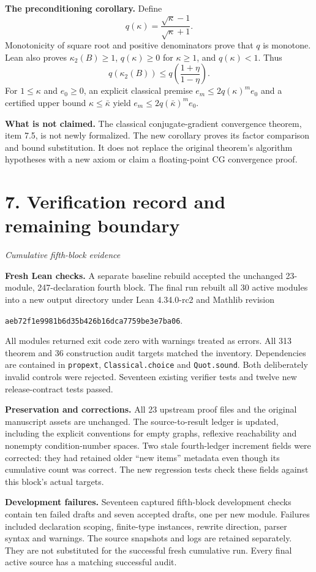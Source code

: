 \documentclass[11pt]{article}
\newcommand{\code}[1]{\texttt{\small #1}}
\newcommand{\pageheading}[2]{\section*{\color{ink}#1}\textit{#2}\par}
\begin{document}
\textbf{The preconditioning corollary.} Define
\[
q(\kappa)=\frac{\sqrt\kappa-1}{\sqrt\kappa+1}.
\]
Monotonicity of square root and positive denominators prove that $q$ is monotone. Lean also proves $\kappa_2(B)\geq1$, $q(\kappa)\geq0$ for $\kappa\geq1$, and $q(\kappa)<1$. Thus
\[
\boxed{q(\kappa_2(B))\leq q\!\left(\frac{1+\eta}{1-\eta}\right).}
\]
For $1\leq\kappa$ and $e_0\geq0$, an explicit classical premise $e_m\leq2q(\kappa)^m e_0$ and a certified upper bound $\kappa\leq\bar\kappa$ yield $e_m\leq2q(\bar\kappa)^m e_0$.

\textbf{What is not claimed.} The classical conjugate-gradient convergence theorem, item 7.5, is not newly formalized. The new corollary proves its factor comparison and bound substitution. It does not replace the original theorem's algorithm hypotheses with a new axiom or claim a floating-point CG convergence proof.

\newpage
\pageheading{7. Verification record and remaining boundary}{Cumulative fifth-block evidence}
\textbf{Fresh Lean checks.} A separate baseline rebuild accepted the unchanged 23-module, 247-declaration fourth block. The final run rebuilt all 30 active modules into a new output directory under Lean 4.34.0-rc2 and Mathlib revision
\begin{center}\code{aeb72f1e9981b6d35b426b16dca7759be3e7ba06}.\end{center}
All modules returned exit code zero with warnings treated as errors. All 313 theorem and 36 construction audit targets matched the inventory. Dependencies are contained in \code{propext}, \code{Classical.choice} and \code{Quot.sound}. Both deliberately invalid controls were rejected. Seventeen existing verifier tests and twelve new release-contract tests passed.

\textbf{Preservation and corrections.} All 23 upstream proof files and the original manuscript assets are unchanged. The source-to-result ledger is updated, including the explicit conventions for empty graphs, reflexive reachability and nonempty condition-number spaces. Two stale fourth-ledger increment fields were corrected: they had retained older ``new items'' metadata even though its cumulative count was correct. The new regression tests check these fields against this block's actual targets.

\textbf{Development failures.} Seventeen captured fifth-block development checks contain ten failed drafts and seven accepted drafts, one per new module. Failures included declaration scoping, finite-type instances, rewrite direction, parser syntax and warnings. The source snapshots and logs are retained separately. They are not substituted for the successful fresh cumulative run. Every final active source has a matching successful audit.
\end{document}
